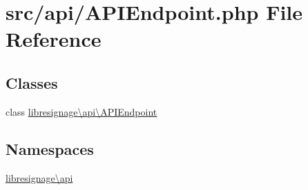 \hypertarget{APIEndpoint_8php}{}\section{src/api/\+A\+P\+I\+Endpoint.php File Reference}
\label{APIEndpoint_8php}
\subsection*{Classes}
\begin{DoxyCompactItemize}
\item 
class \hyperlink{classlibresignage_1_1api_1_1APIEndpoint}{libresignage\textbackslash{}api\textbackslash{}\+A\+P\+I\+Endpoint}
\end{DoxyCompactItemize}
\subsection*{Namespaces}
\begin{DoxyCompactItemize}
\item 
 \hyperlink{namespacelibresignage_1_1api}{libresignage\textbackslash{}api}
\end{DoxyCompactItemize}
